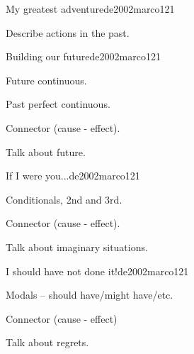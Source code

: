 \begin{syllabus}
\begin{unit}{My greatest adventure}{}{de2002marco}{12}{1}
   \begin{learningoutcomes}
      \item Describe actions in the past.
   \end{learningoutcomes}

\end{unit}

\begin{unit}{Building our future}{}{de2002marco}{12}{1}
   \begin{topics}
      \item Future continuous.
      \item Past perfect continuous.
      \item Connector (cause - effect).
   \end{topics}

   \begin{learningoutcomes}
      \item Talk about future.
   \end{learningoutcomes}

\end{unit}

\begin{unit}{If I were you...}{}{de2002marco}{12}{1}
   \begin{topics}
      \item Conditionals, 2nd and 3rd.
      \item Connector (cause - effect).
   \end{topics}

   \begin{learningoutcomes}
      \item Talk about imaginary situations. 
   \end{learningoutcomes}

\end{unit}

\begin{unit}{I should have not done it!}{}{de2002marco}{12}{1}
   \begin{topics}
      \item Modals – should have/might have/etc.
      \item Connector (cause - effect)
   \end{topics}

   \begin{learningoutcomes}
      \item Talk about regrets.
   \end{learningoutcomes}

\end{unit}


\end{syllabus}
